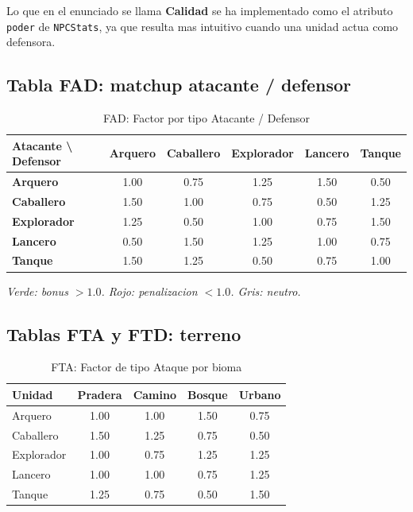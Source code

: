 \documentclass[12pt,a4paper]{article}
\newcommand{\bonus}[1]{\cellcolor{bonusgreen}#1}
\newcommand{\malus}[1]{\cellcolor{malusred}#1}
\newcommand{\neutral}[1]{\cellcolor{neutralgray}#1}
\begin{document}
Lo que en el enunciado se llama \textbf{Calidad} se ha implementado
como el atributo \texttt{poder} de \texttt{NPCStats}, ya que resulta
mas intuitivo cuando una unidad actua como defensora.

\subsection{Tabla FAD: matchup atacante / defensor}

\begin{table}[H]
\centering
\caption{FAD: Factor por tipo Atacante / Defensor}
\label{tab:fad}
\begin{tabular}{l|ccccc}
\toprule
\textbf{Atacante \textbackslash{} Defensor} & \textbf{Arquero} & \textbf{Caballero} & \textbf{Explorador} & \textbf{Lancero} & \textbf{Tanque} \\
\midrule
\textbf{Arquero}    & \neutral{1.00} & \malus{0.75} & \bonus{1.25} & \bonus{1.50} & \malus{0.50} \\
\textbf{Caballero}  & \bonus{1.50} & \neutral{1.00} & \malus{0.75} & \malus{0.50} & \bonus{1.25} \\
\textbf{Explorador} & \bonus{1.25} & \malus{0.50} & \neutral{1.00} & \malus{0.75} & \bonus{1.50} \\
\textbf{Lancero}    & \malus{0.50} & \bonus{1.50} & \bonus{1.25} & \neutral{1.00} & \malus{0.75} \\
\textbf{Tanque}     & \bonus{1.50} & \bonus{1.25} & \malus{0.50} & \malus{0.75} & \neutral{1.00} \\
\bottomrule
\end{tabular}
\end{table}

\noindent\textit{Verde: bonus $> 1.0$. Rojo: penalizacion $< 1.0$. Gris: neutro.}

\subsection{Tablas FTA y FTD: terreno}

\begin{table}[H]
\centering
\caption{FTA: Factor de tipo Ataque por bioma}
\label{tab:fta}
\begin{tabular}{l|cccc}
\toprule
\textbf{Unidad} & \textbf{Pradera} & \textbf{Camino} & \textbf{Bosque} & \textbf{Urbano} \\
\midrule
Arquero    & \neutral{1.00} & \neutral{1.00} & \bonus{1.50} & \malus{0.75} \\
Caballero  & \bonus{1.50} & \bonus{1.25} & \malus{0.75} & \malus{0.50} \\
Explorador & \neutral{1.00} & \malus{0.75} & \bonus{1.25} & \bonus{1.25} \\
Lancero    & \neutral{1.00} & \neutral{1.00} & \malus{0.75} & \bonus{1.25} \\
Tanque     & \bonus{1.25} & \malus{0.75} & \malus{0.50} & \bonus{1.50} \\
\bottomrule
\end{tabular}
\end{table}
\end{document}
